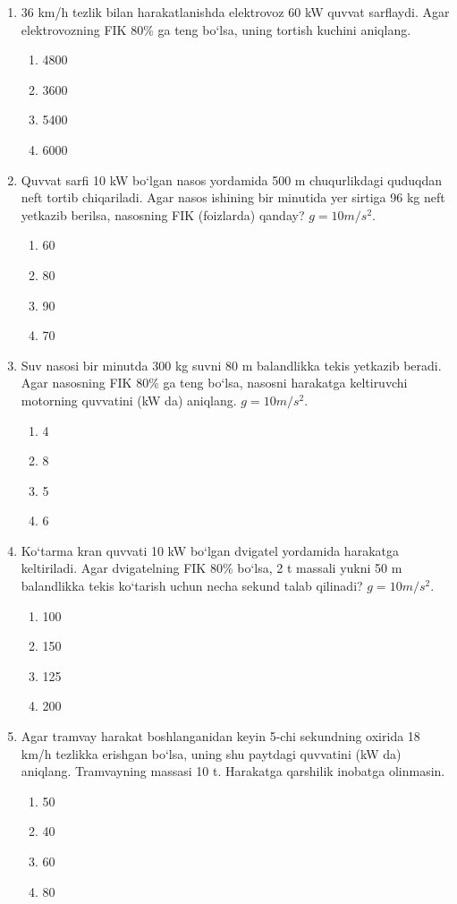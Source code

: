 \begin{enumerate}
\item 36 km/h tezlik bilan harakatlanishda elektrovoz 60 kW quvvat sarflaydi. Agar elektrovozning FIK 80\% ga teng bo‘lsa, uning tortish kuchini aniqlang.
\begin{enumerate}[label=\Alph*)]
\item 4800
\item 3600
\item 5400
\item 6000
\end{enumerate}

\item Quvvat sarfi 10 kW bo‘lgan nasos yordamida 500 m chuqurlikdagi quduqdan neft tortib chiqariladi. Agar nasos ishining bir minutida yer sirtiga 96 kg neft yetkazib berilsa, nasosning FIK (foizlarda) qanday? $g=10 m/s^2$.
\begin{enumerate}[label=\Alph*)]
\item 60
\item 80
\item 90
\item 70
\end{enumerate}

\item Suv nasosi bir minutda 300 kg suvni 80 m balandlikka tekis yetkazib beradi. Agar nasosning FIK 80\% ga teng bo‘lsa, nasosni harakatga keltiruvchi motorning quvvatini (kW da) aniqlang. $g=10 m/s^2$.
\begin{enumerate}[label=\Alph*)]
\item 4
\item 8
\item 5
\item 6
\end{enumerate}

\item Ko‘tarma kran quvvati 10 kW bo‘lgan dvigatel yordamida harakatga keltiriladi. Agar dvigatelning FIK 80\% bo‘lsa, 2 t massali yukni 50 m balandlikka tekis ko‘tarish uchun necha sekund talab qilinadi? $g=10 m/s^2$.
\begin{enumerate}[label=\Alph*)]
\item 100
\item 150
\item 125
\item 200
\end{enumerate}

\item Agar tramvay harakat boshlanganidan keyin 5-chi sekundning oxirida 18 km/h tezlikka erishgan bo‘lsa, uning shu paytdagi quvvatini (kW da) aniqlang. Tramvayning massasi 10 t. Harakatga qarshilik inobatga olinmasin.
\begin{enumerate}[label=\Alph*)]
\item 50
\item 40
\item 60
\item 80
\end{enumerate}


\end{enumerate}
